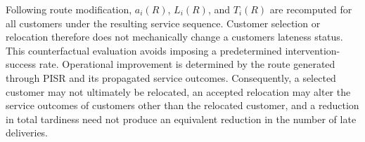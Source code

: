 \documentclass[
]{article}
\begin{document}
Following route modification, \(a_{i}(R)\), \(L_{i}(R)\), and
\(T_{i}(R)\) are recomputed for all customers under the resulting
service sequence. Customer selection or relocation therefore does not
mechanically change a customer\textquotesingle s lateness status. This
counterfactual evaluation avoids imposing a predetermined
intervention-success rate. Operational improvement is determined by the
route generated through PISR and its propagated service outcomes.
Consequently, a selected customer may not ultimately be relocated, an
accepted relocation may alter the service outcomes of customers other
than the relocated customer, and a reduction in total tardiness need not
produce an equivalent reduction in the number of late deliveries.
\end{document}
